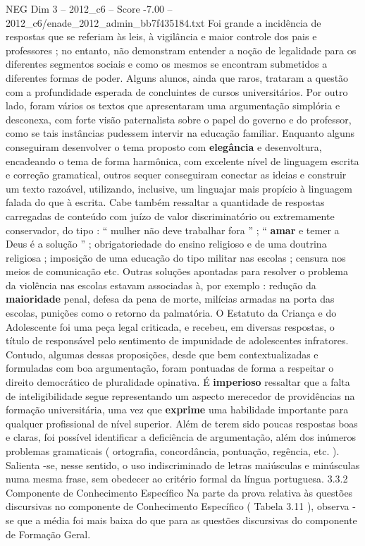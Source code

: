 \begin{textsample}{NEG Dim 3 – 2012\_c6 – Score -7.00 – 2012\_c6/enade\_2012\_admin\_bb7f435184.txt}
Foi grande a incidência de respostas que se referiam às leis, à vigilância e maior controle dos pais e professores ; no entanto, não demonstram entender a noção de legalidade para os diferentes segmentos sociais e como os mesmos se encontram submetidos a diferentes formas de poder.
Alguns alunos, ainda que raros, trataram a questão com a profundidade esperada de concluintes de cursos universitários.
Por outro lado, foram vários os textos que apresentaram uma argumentação simplória e desconexa, com forte visão paternalista sobre o papel do governo e do professor, como se tais instâncias pudessem intervir na educação familiar.
Enquanto alguns conseguiram desenvolver o tema proposto com \textbf{elegância} e desenvoltura, encadeando o tema de forma harmônica, com excelente nível de linguagem escrita e correção gramatical, outros sequer conseguiram conectar as ideias e construir um texto razoável, utilizando, inclusive, um linguajar mais propício à linguagem falada do que à escrita.
Cabe também ressaltar a quantidade de respostas carregadas de conteúdo com juízo de valor discriminatório ou extremamente conservador, do tipo : “ mulher não deve trabalhar fora ” ; “ \textbf{amar} e temer a Deus é a solução ” ; obrigatoriedade do ensino religioso e de uma doutrina religiosa ; imposição de uma educação do tipo militar nas escolas ; censura nos meios de comunicação etc.
Outras soluções apontadas para resolver o problema da violência nas escolas estavam associadas à, por exemplo : redução da \textbf{maioridade} penal, defesa da pena de morte, milícias armadas na porta das escolas, punições como o retorno da palmatória.
O Estatuto da Criança e do Adolescente foi uma peça legal criticada, e recebeu, em diversas respostas, o título de responsável pelo sentimento de impunidade de adolescentes infratores.
Contudo, algumas dessas proposições, desde que bem contextualizadas e formuladas com boa argumentação, foram pontuadas de forma a respeitar o direito democrático de pluralidade opinativa.
É \textbf{imperioso} ressaltar que a falta de inteligibilidade segue representando um aspecto merecedor de providências na formação universitária, uma vez que \textbf{exprime} uma habilidade importante para qualquer profissional de nível superior.
Além de terem sido poucas respostas boas e claras, foi possível identificar a deficiência de argumentação, além dos inúmeros problemas gramaticais ( ortografia, concordância, pontuação, regência, etc. ).
Salienta -se, nesse sentido, o uso indiscriminado de letras maiúsculas e minúsculas numa mesma frase, sem obedecer ao critério formal da língua portuguesa. 3.3.2 Componente de Conhecimento Específico Na parte da prova relativa às questões discursivas no componente de Conhecimento Específico ( Tabela 3.11 ), observa -se que a média foi mais baixa do que para as questões discursivas do componente de Formação Geral.

\end{textsample}
